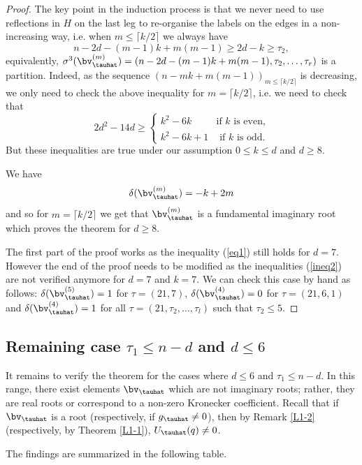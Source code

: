 \begin{proof}
	
	The key point in the induction process is that we never need to use reflections in $H$ on the last leg to re-organise the labels on the edges in a non-increasing way, i.e. when $m\leq\lceil k/2\rceil$ we always have
	$$
	n-2d-(m-1)k+m(m-1)\geq 2d-k\geq \tau_2,
	$$
	equivalently, $\sigma^3(\bv^{(m)}_\tauhat)=(n-2d-(m-1)k+m(m-1),\tau_2, \ldots , \tau_r)$ is a partition.
	Indeed, as the sequence $(n-mk+m(m-1))_{m\leq\lceil k/2\rceil}$ is decreasing, we only need to check the above inequality for $m=\lceil k/2\rceil$, i.e. we need to check that
	\begin{equation}
		2d^2-14d\geq\begin{cases}k^2-6k &\text{if } k\text{ is even,}\\k^2-6k+1&\text{ if } k\text{ is odd.}\end{cases}
		\label{ineq2}\end{equation}
	But these inequalities are true under our assumption $0\leq k\leq d$ and $d\geq 8$.
	
	We have
	$$
	\delta(\bv_\tauhat^{(m)})=-k+2m
	$$
	and so for $m=\lceil k/2\rceil$ we get that $\bv^{(m)}_\tauhat$ is a fundamental imaginary root which proves the theorem for $d\geq 8$.
	
	
	The first part of the proof works as the inequality (\ref{eq1}) still holds for $d=7$. However the end of the proof needs to be modified as the inequalities (\ref{ineq2}) are not verified anymore for $d=7$ and $k=7$. We can check this case by hand as follows: $\delta(\bv_\tauhat^{(5)})=1$ for $\tau=(21,7)$, $\delta(\bv_\tauhat^{(4)})=0$ for $\tau=(21,6,1)$ and $\delta(\bv_\tauhat^{(4)})=1$ for all $\tau=(21,\tau_2,\ldots , \tau_l)$ such that $\tau_2 \leq 5$.
\end{proof}

\subsection{Remaining case \texorpdfstring{$\tau_1\leq n-d$ and $d \leq 6$}{tau\_1 ≤ n-d and d ≤ 6}}
It remains to verify the theorem for the cases where $d\leq 6$ and $\tau_1 \leq n-d$.
In this range, there exist elements $\bv_\tauhat$ 
which are not imaginary roots; rather, they are real roots or correspond to a non-zero Kronecker coefficient. Recall that if $\bv_\tauhat$  is a root (respectively, if $g_\tauhat\neq 0$), then by Remark \ref{L1-2} (respectively, by Theorem \ref{L1-1}), $U_\tauhat(q)\neq 0$.


The findings are summarized in the following table.




